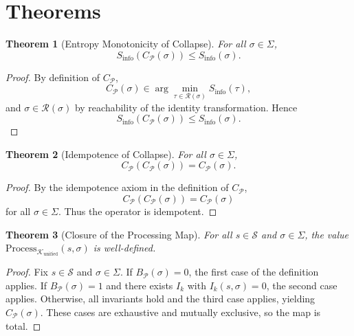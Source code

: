 \documentclass[12pt]{article}
\theoremstyle{definition}
\theoremstyle{plain}
\newtheorem{theorem}{Theorem}[section]
\begin{document}
\section{Theorems}

\begin{theorem}[Entropy Monotonicity of Collapse]
For all \(\sigma \in \Sigma\),
\[
S_{\mathrm{info}}(C_{\mathcal{P}}(\sigma)) \le S_{\mathrm{info}}(\sigma).
\]
\end{theorem}

\begin{proof}
By definition of \(C_{\mathcal{P}}\),
\[
C_{\mathcal{P}}(\sigma) \in \arg\min_{\tau \in \mathcal{R}(\sigma)} S_{\mathrm{info}}(\tau),
\]
and \(\sigma \in \mathcal{R}(\sigma)\) by reachability of the identity transformation. Hence
\[
S_{\mathrm{info}}(C_{\mathcal{P}}(\sigma)) \le S_{\mathrm{info}}(\sigma).
\]
\end{proof}

\begin{theorem}[Idempotence of Collapse]
For all \(\sigma \in \Sigma\),
\[
C_{\mathcal{P}}(C_{\mathcal{P}}(\sigma)) = C_{\mathcal{P}}(\sigma).
\]
\end{theorem}

\begin{proof}
By the idempotence axiom in the definition of \(C_{\mathcal{P}}\),
\[
C_{\mathcal{P}}(C_{\mathcal{P}}(\sigma)) = C_{\mathcal{P}}(\sigma)
\]
for all \(\sigma \in \Sigma\). Thus the operator is idempotent.
\end{proof}

\begin{theorem}[Closure of the Processing Map]
For all \(s \in \mathcal{S}\) and \(\sigma \in \Sigma\), the value
\(\mathrm{Process}_{\mathcal{K}_{\mathrm{unified}}}(s,\sigma)\) is well-defined.
\end{theorem}

\begin{proof}
Fix \(s \in \mathcal{S}\) and \(\sigma \in \Sigma\). If \(B_{\mathcal{P}}(\sigma)=0\), the first case of the definition applies. If \(B_{\mathcal{P}}(\sigma)=1\) and there exists \(I_k\) with \(I_k(s,\sigma)=0\), the second case applies. Otherwise, all invariants hold and the third case applies, yielding \(C_{\mathcal{P}}(\sigma)\). These cases are exhaustive and mutually exclusive, so the map is total.
\end{proof}
\end{document}

